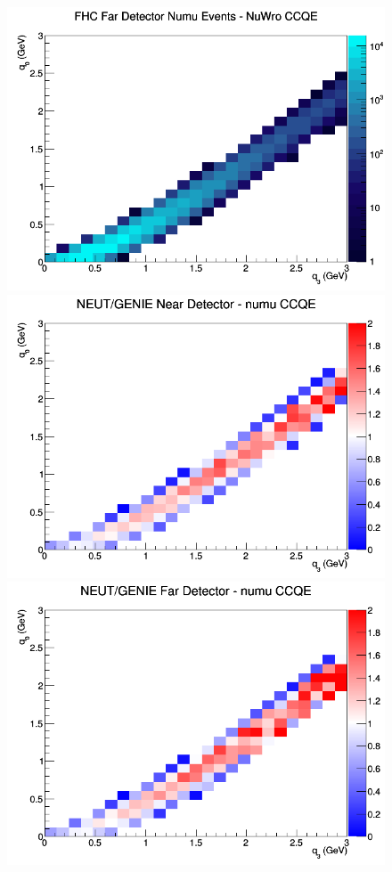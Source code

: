 \begin{figure}[h]
\endminipage
{}
\includegraphics[width=\linewidth]{q0_q3/nominal/CCQE_FHC_FD_numu_q3_q0_NuWro.png}
\endminipage
\newline
{}
\includegraphics[width=\linewidth]{q0_q3/nominal/ratios/CCQE_NEUT_GENIE_numu_near_q3_q0.png}
\endminipage
{}
\includegraphics[width=\linewidth]{q0_q3/nominal/ratios/CCQE_NEUT_GENIE_numu_far_q3_q0.png}

\end{figure}
